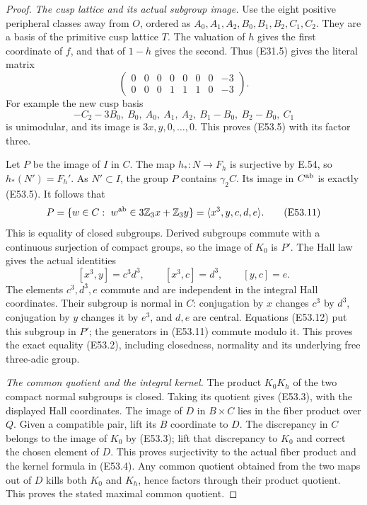 \begin{proof}
\emph{The cusp lattice and its actual subgroup image.}
Use the eight positive peripheral classes away from
$O$, ordered as $A_0,A_1,A_2,B_0,B_1,B_2,C_1,C_2$.
They are a basis of the primitive cusp lattice $T$.
The valuation of $h$ gives the first coordinate of
$f$, and that of $1-h$ gives the second. Thus
(E31.5) gives the literal matrix
\[
 \begin{pmatrix}
 0&0&0&0&0&0&0&-3\\
 0&0&0&1&1&1&0&-3
 \end{pmatrix}.
 \tag{E53.9}
\]
For example the new cusp basis
\[
 -C_2-3B_0,\ B_0,\ A_0,\ A_1,\ A_2,\
 B_1-B_0,\ B_2-B_0,\ C_1
 \tag{E53.10}
\]
is unimodular, and its image is $3x,y,0,\ldots,0$.
This proves (E53.5) with its factor three.

Let $P$ be the image of $I$ in $C$.
The map $h_*:N\to F_h$ is surjective by E.54,
so $h_*(N')=F_h'$. As $N'\subset I$, the group
$P$ contains $\gamma_2C$.
Its image in $C^{\rm ab}$ is exactly (E53.5).
It follows that
\[
       P=\{w\in C:\ w^{\rm ab}\in
                    3\mathbb Z_3x+\mathbb Z_3y\}
         =\langle x^3,y,c,d,e\rangle .
 \tag{E53.11}
\]
This is equality of closed subgroups.
Derived subgroups commute with a continuous
surjection of compact groups, so the image
of $K_0$ is $P'$.
The Hall law gives the actual identities
\[
 [x^3,y]=c^3d^3,\qquad
 [x^3,c]=d^3,\qquad [y,c]=e.
 \tag{E53.12}
\]
The elements $c^3,d^3,e$ commute and are
independent in the integral Hall coordinates.
Their subgroup is normal in $C$:
conjugation by $x$ changes $c^3$ by $d^3$,
conjugation by $y$ changes it by $e^3$,
and $d,e$ are central.
Equations (E53.12) put this subgroup in $P'$;
the generators in (E53.11) commute modulo it.
This proves the exact equality (E53.2), including
closedness, normality and its underlying free
three-adic group.

\emph{The common quotient and the integral kernel.}
The product $K_0K_h$ of the two compact normal
subgroups is closed. Taking its quotient gives
(E53.3), with the displayed Hall coordinates.
The image of $D$ in $B\times C$ lies in the
fiber product over $Q$.
Given a compatible pair, lift its $B$ coordinate
to $D$. The discrepancy in $C$ belongs to the
image of $K_0$ by (E53.3); lift that discrepancy
to $K_0$ and correct the chosen element of $D$.
This proves surjectivity to the actual fiber
product and the kernel formula in (E53.4).
Any common quotient obtained from the two
maps out of $D$ kills both $K_0$ and $K_h$,
hence factors through their product quotient.
This proves the stated maximal common quotient.


\end{proof}
